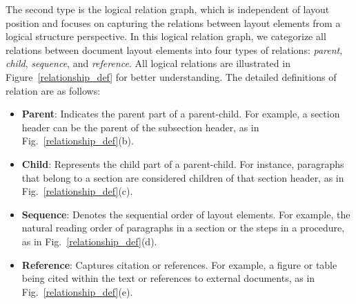 The second type is the logical relation graph, which is independent of layout position and focuses on capturing the relations between layout elements from a logical structure perspective. In this logical relation graph, we categorize all relations between document layout elements into four types of relations: \textit{parent}, \textit{child}, \textit{sequence}, and \textit{reference}. All logical relations are illustrated in Figure~\ref{relationship_def} for better understanding. The detailed definitions of relation are as follows:
\begin{itemize}
\item \textbf{Parent}: Indicates the parent part of a parent-child. For example, a section header can be the parent of the subsection header, as in Fig.~\ref{relationship_def}(b).
\item \textbf{Child}: Represents the child part of a parent-child. For instance, paragraphs that belong to a section are considered children of that section header, as in Fig.~\ref{relationship_def}(c).
\item \textbf{Sequence}: Denotes the sequential order of layout elements. For example, the natural reading order of paragraphs in a section or the steps in a procedure, as in Fig.~\ref{relationship_def}(d).
\item \textbf{Reference}: Captures citation or references. For example, a figure or table being cited within the text or references to external documents, as in Fig.~\ref{relationship_def}(e).
\end{itemize}


